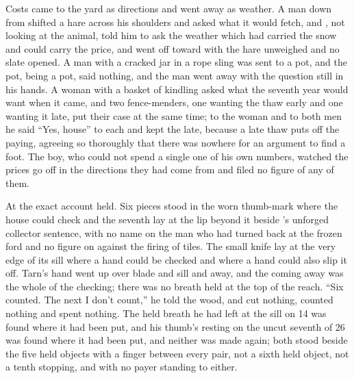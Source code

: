 Costs came to the yard as directions and went away as weather. A man down from  shifted a hare across his shoulders and asked what it would fetch, and , not looking at the animal, told him to ask the weather which had carried the snow and could carry the price, and went off toward  with the hare unweighed and no slate opened. A man with a cracked jar in a rope sling was sent to a pot, and the pot, being a pot, said nothing, and the man went away with the question still in his hands. A woman with a basket of kindling asked what the seventh year would want when it came, and two fence-menders, one wanting the thaw early and one wanting it late, put their case at the same time; to the woman and to both men he said “Yes, house” to each and kept the late, because a late thaw puts off the paying, agreeing so thoroughly that there was nowhere for an argument to find a foot. The boy, who could not spend a single one of his own numbers, watched the prices go off in the directions they had come from and filed no figure of any of them.

At  the exact account held. Six pieces stood in the worn thumb-mark where the house could check and the seventh lay at the lip beyond it beside 's unforged collector sentence, with no name on the man who had turned back at the frozen ford and no figure on  against the firing of tiles. The small knife lay at the very edge of its sill where a hand could be checked and where a hand could also slip it off. Tarn's hand went up over blade and sill and away, and the coming away was the whole of the checking; there was no breath held at the top of the reach. “Six counted. The next I don't count,” he told the wood, and cut nothing, counted nothing and spent nothing. The held breath he had left at the sill on  14 was found where it had been put, and his thumb's resting on the uncut seventh of  26 was found where it had been put, and neither was made again; both stood beside the five held objects with a finger between every pair, not a sixth held object, not a tenth stopping, and with no payer standing to either.

